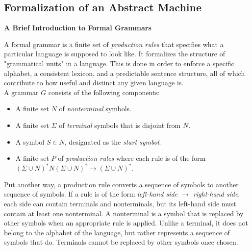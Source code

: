 

\subsection{Formalization of an Abstract Machine}

\begin{tcolorbox}[breakable, enhanced, colback=textbook-blue, sharp corners]
	\vspace{2mm}
	\begin{center}
		\textbf{A Brief Introduction to Formal Grammars}
	\end{center}
	\vspace{1mm}
	A formal grammar is a finite set of \textit{production rules} that specifies what a particular language is supposed to look like. It formalizes the structure of "grammatical units" in a language. This is done in order to enforce a specific alphabet, a consistent lexicon, and a predictable sentence structure, all of which contribute to how useful and distinct any given language is. \\
	
	A grammar $G$ consists of the following components:
	\begin{itemize}
		\item A finite set $N$ of \textit{nonterminal} symbols.
		\item A finite set $\Sigma$ of \textit{terminal} symbols that is disjoint from $N$.
		\item A symbol $S\in N$, designated as the \textit{start symbol}.
		\item A finite set $P$ of \textit{production rules} where each rule is of the form ${(\Sigma\cup N)^*N(\Sigma\cup N)^*\rightarrow(\Sigma\cup N)^*}$.
	\end{itemize}
	
	Put another way, a production rule converts a sequence of symbols to another sequence of symbols. If a rule is of the form \textit{left-hand side $\rightarrow$ right-hand side}, each side can contain terminals and nonterminals, but its left-hand side must contain at least one nonterminal. A nonterminal is a symbol that is replaced by other symbols when an appropriate rule is applied. Unlike a terminal, it does not belong to the alphabet of the language, but rather represents a sequence of symbols that do. Terminals cannot be replaced by other symbols once chosen. \\
	

\end{tcolorbox}
